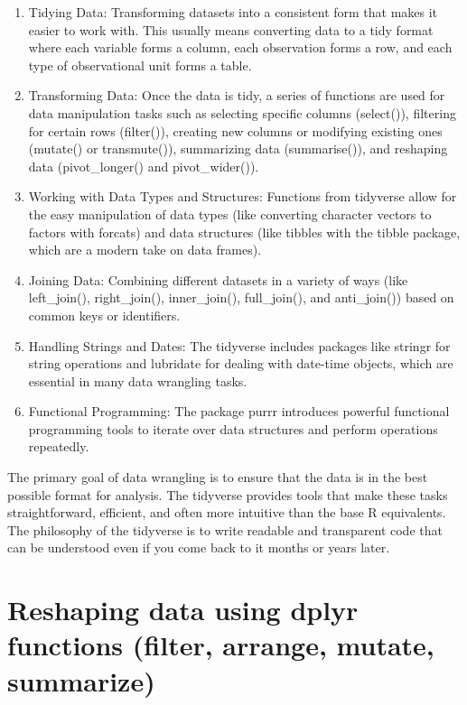 \documentclass[
]{book}
\begin{document}
\begin{enumerate}
\def\labelenumi{\arabic{enumi}.}
\item
  Tidying Data: Transforming datasets into a consistent form that
  makes it easier to work with. This usually means converting data to
  a tidy format where each variable forms a column, each observation
  forms a row, and each type of observational unit forms a table.
\item
  Transforming Data: Once the data is tidy, a series of functions are
  used for data manipulation tasks such as selecting specific columns
  (select()), filtering for certain rows (filter()), creating new
  columns or modifying existing ones (mutate() or transmute()),
  summarizing data (summarise()), and reshaping data (pivot\_longer()
  and pivot\_wider()).
\item
  Working with Data Types and Structures: Functions from tidyverse
  allow for the easy manipulation of data types (like converting
  character vectors to factors with forcats) and data structures (like
  tibbles with the tibble package, which are a modern take on data
  frames).
\item
  Joining Data: Combining different datasets in a variety of ways
  (like left\_join(), right\_join(), inner\_join(), full\_join(), and
  anti\_join()) based on common keys or identifiers.
\item
  Handling Strings and Dates: The tidyverse includes packages like
  stringr for string operations and lubridate for dealing with
  date-time objects, which are essential in many data wrangling tasks.
\item
  Functional Programming: The package purrr introduces powerful
  functional programming tools to iterate over data structures and
  perform operations repeatedly.
\end{enumerate}

The primary goal of data wrangling is to ensure that the data is in the
best possible format for analysis. The tidyverse provides tools that
make these tasks straightforward, efficient, and often more intuitive
than the base R equivalents. The philosophy of the tidyverse is to write
readable and transparent code that can be understood even if you come
back to it months or years later.

\section*{Reshaping data using dplyr functions (filter, arrange, mutate, summarize)}\label{reshaping-data-using-dplyr-functions-filter-arrange-mutate-summarize}
\end{document}
